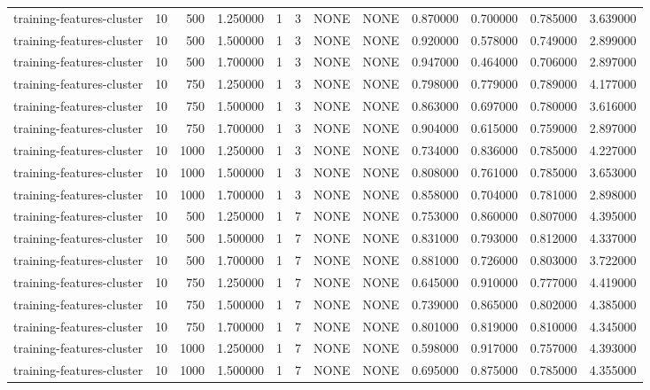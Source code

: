 \begin{tabular}{lrrrllllrrrr}
training-features-cluster & 10 & 500 & 1.250000 & 1 & 3 & NONE & NONE & 0.870000 & 0.700000 & 0.785000 & 3.639000 \\
training-features-cluster & 10 & 500 & 1.500000 & 1 & 3 & NONE & NONE & 0.920000 & 0.578000 & 0.749000 & 2.899000 \\
training-features-cluster & 10 & 500 & 1.700000 & 1 & 3 & NONE & NONE & 0.947000 & 0.464000 & 0.706000 & 2.897000 \\
training-features-cluster & 10 & 750 & 1.250000 & 1 & 3 & NONE & NONE & 0.798000 & 0.779000 & 0.789000 & 4.177000 \\
training-features-cluster & 10 & 750 & 1.500000 & 1 & 3 & NONE & NONE & 0.863000 & 0.697000 & 0.780000 & 3.616000 \\
training-features-cluster & 10 & 750 & 1.700000 & 1 & 3 & NONE & NONE & 0.904000 & 0.615000 & 0.759000 & 2.897000 \\
training-features-cluster & 10 & 1000 & 1.250000 & 1 & 3 & NONE & NONE & 0.734000 & 0.836000 & 0.785000 & 4.227000 \\
training-features-cluster & 10 & 1000 & 1.500000 & 1 & 3 & NONE & NONE & 0.808000 & 0.761000 & 0.785000 & 3.653000 \\
training-features-cluster & 10 & 1000 & 1.700000 & 1 & 3 & NONE & NONE & 0.858000 & 0.704000 & 0.781000 & 2.898000 \\
training-features-cluster & 10 & 500 & 1.250000 & 1 & 7 & NONE & NONE & 0.753000 & 0.860000 & 0.807000 & 4.395000 \\
training-features-cluster & 10 & 500 & 1.500000 & 1 & 7 & NONE & NONE & 0.831000 & 0.793000 & 0.812000 & 4.337000 \\
training-features-cluster & 10 & 500 & 1.700000 & 1 & 7 & NONE & NONE & 0.881000 & 0.726000 & 0.803000 & 3.722000 \\
training-features-cluster & 10 & 750 & 1.250000 & 1 & 7 & NONE & NONE & 0.645000 & 0.910000 & 0.777000 & 4.419000 \\
training-features-cluster & 10 & 750 & 1.500000 & 1 & 7 & NONE & NONE & 0.739000 & 0.865000 & 0.802000 & 4.385000 \\
training-features-cluster & 10 & 750 & 1.700000 & 1 & 7 & NONE & NONE & 0.801000 & 0.819000 & 0.810000 & 4.345000 \\
training-features-cluster & 10 & 1000 & 1.250000 & 1 & 7 & NONE & NONE & 0.598000 & 0.917000 & 0.757000 & 4.393000 \\
training-features-cluster & 10 & 1000 & 1.500000 & 1 & 7 & NONE & NONE & 0.695000 & 0.875000 & 0.785000 & 4.355000 \\

\end{tabular}
